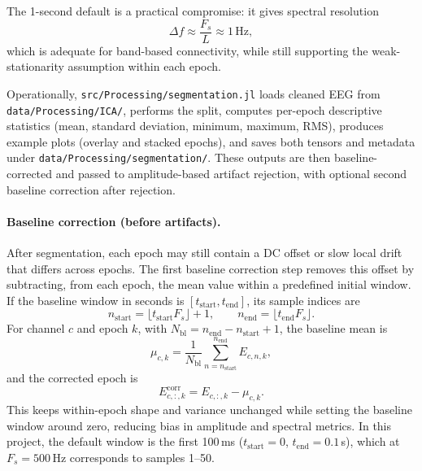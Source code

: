 The 1-second default is a practical compromise: it gives spectral resolution
\[
\Delta f\approx\frac{F_s}{L}\approx 1\,\mathrm{Hz},
\]
which is adequate for band-based connectivity, while still supporting the weak-stationarity assumption within each epoch.

Operationally, \texttt{src/Processing/segmentation.jl} loads cleaned EEG from \texttt{data/Processing/ICA/}, performs the split, computes per-epoch descriptive statistics (mean, standard deviation, minimum, maximum, RMS), produces example plots (overlay and stacked epochs), and saves both tensors and metadata under \texttt{data/Processing/segmentation/}. These outputs are then baseline-corrected and passed to amplitude-based artifact rejection, with optional second baseline correction after rejection.

\paragraph{Baseline correction (before artifacts).}
After segmentation, each epoch may still contain a DC offset or slow local drift that differs across epochs. The first baseline correction step removes this offset by subtracting, from each epoch, the mean value within a predefined initial window. If the baseline window in seconds is $[t_{\mathrm{start}},t_{\mathrm{end}}]$, its sample indices are
\[
n_{\mathrm{start}}=\lfloor t_{\mathrm{start}}F_s\rfloor+1,\qquad
n_{\mathrm{end}}=\lfloor t_{\mathrm{end}}F_s\rfloor.
\]
For channel $c$ and epoch $k$, with $N_{\mathrm{bl}}=n_{\mathrm{end}}-n_{\mathrm{start}}+1$, the baseline mean is
\[
\mu_{c,k}=\frac{1}{N_{\mathrm{bl}}}\sum_{n=n_{\mathrm{start}}}^{n_{\mathrm{end}}}E_{c,n,k},
\]
and the corrected epoch is
\[
E^{\mathrm{corr}}_{c,:,k}=E_{c,:,k}-\mu_{c,k}.
\]
This keeps within-epoch shape and variance unchanged while setting the baseline window around zero, reducing bias in amplitude and spectral metrics. In this project, the default window is the first 100\,ms ($t_{\mathrm{start}}=0$, $t_{\mathrm{end}}=0.1$\,s), which at $F_s=500$\,Hz corresponds to samples 1--50.
